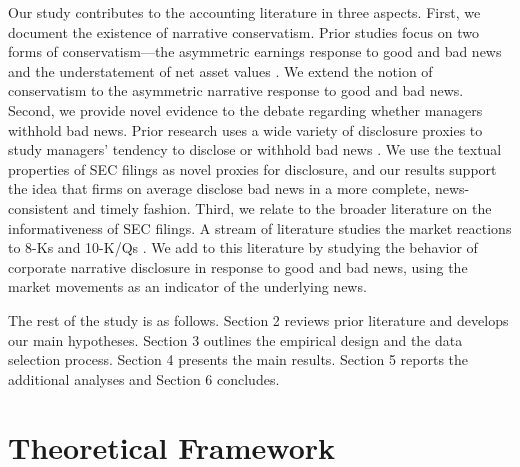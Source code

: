 \documentclass[letterpaper,12pt]{article}
\begin{document}
\begin{spacing}{1.5}
Our study contributes to the accounting literature in three aspects. First, we document the existence of narrative conservatism. Prior studies focus on two forms of conservatism---the asymmetric earnings response to good and bad news and the understatement of net asset values \cite{basuConservatismPrincipleAsymmetric1997, ballEarningsQualityUK2005, beaverConditionalUnconditionalConservatism2005}. We extend the notion of conservatism to the asymmetric narrative response to good and bad news. 
Second, we provide novel evidence to the debate regarding whether managers withhold bad news. Prior research uses a wide variety of disclosure proxies to study managers' tendency to disclose or withhold bad news \cite{kasznikWarnNotWarn1995, kothariManagersWithholdBad2009, baoManagersDiscloseWithhold2019}. We use the textual properties of SEC filings as novel proxies for disclosure, and our results support the idea that firms on average disclose bad news in a more complete, news-consistent and timely fashion. Third, we relate to the broader literature on the informativeness of SEC filings. A stream of literature studies the market reactions to 8-Ks \cite{carterRelevanceForm8K1999, pinskerHasFirmsForm2006, lermanNewForm8K2010} and 10-K/Qs \cite{alfordExtensionsViolationsStatutory1994, liAnnualReportReadability2008, liInformationContentForwardLooking2010}. We add to this literature by studying the behavior of corporate narrative disclosure in response to good and bad news, using the market movements as an indicator of the underlying news.

The rest of the study is as follows. Section 2 reviews prior literature and develops our main hypotheses. Section 3 outlines the empirical design and the data selection process. Section 4 presents the main results. Section 5 reports the additional analyses and Section 6 concludes.

\section{Theoretical Framework}

\end{spacing}
\end{document}
